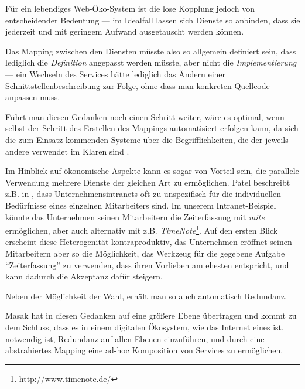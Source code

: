 
\label{l:intro-loosecoupling}Für ein lebendiges Web-Öko-System ist die lose Kopplung jedoch von entscheidender Bedeutung --- im Idealfall lassen sich Dienste so anbinden, dass sie jederzeit und mit geringem Aufwand ausgetauscht werden können. 

Das Mapping zwischen den Diensten müsste also so allgemein definiert sein, dass lediglich die \emph{Definition} angepasst werden müsste, aber nicht die \emph{Implementierung} --- ein Wechseln des Services hätte lediglich das Ändern einer Schnittstellenbeschreibung zur Folge, ohne dass man konkreten Quellcode anpassen muss.

Führt man diesen Gedanken noch einen Schritt weiter, wäre es optimal, wenn selbst der Schritt des Erstellen des Mappings automatisiert erfolgen kann, da sich die zum Einsatz kommenden Systeme über die Begrifflichkeiten, die der jeweils andere verwendet im Klaren sind \cite{mkdigioe}.

Im Hinblick auf ökonomische Aspekte kann es sogar von Vorteil sein, die parallele Verwendung mehrere Dienste der gleichen Art zu ermöglichen. Patel beschreibt z.B. in \cite{pl-depintra}, dass Unternehmensintranets oft zu unspezifisch für die individuellen Bedürfnisse eines einzelnen Mitarbeiters sind. Im unserem Intranet-Beispiel könnte das Unternehmen seinen Mitarbeitern die Zeiterfassung mit \emph{mite} ermöglichen, aber auch alternativ mit z.B. \emph{TimeNote}\footnote{http://www.timenote.de/}. Auf den ersten Blick erscheint diese Heterogenität kontraproduktiv, das Unternehmen eröffnet seinen Mitarbeitern aber so die Möglichkeit, das Werkzeug für die gegebene Aufgabe "`Zeiterfassung"' zu verwenden, dass ihren  Vorlieben am ehesten entspricht, und kann dadurch die Akzeptanz dafür steigern.

Neben der Möglichkeit der Wahl, erhält man so auch automatisch Redundanz.

Masak hat in \cite{mkulss} diesen Gedanken auf eine größere Ebene übertragen und kommt zu dem Schluss, dass es in einem digitalen Ökosystem, wie das Internet eines ist, notwendig ist, Redundanz auf allen Ebenen einzuführen, und durch eine abstrahiertes Mapping eine ad-hoc Komposition von Services zu ermöglichen.
